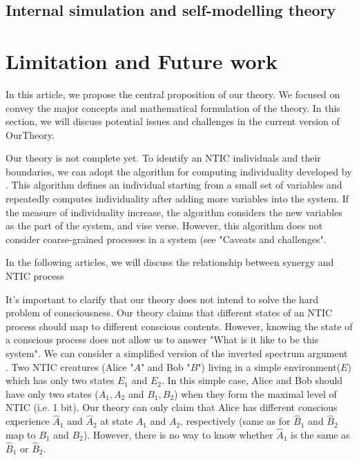 \documentclass[utf8]{article}
\begin{document}
		\subsection{Internal simulation and self-modelling theory}



    \section{Limitation and Future work}\label{sec:Limitation and Future work}  
        In this article, we propose the central proposition of our theory. We focused on convey the major concepts and mathematical formulation of the theory. In this section, we will discuss potential issues and challenges in the current version of \ac{OurTheory}.
        
        
    
    
    
        Our theory is not complete yet. 
        To identify an NTIC individuals and their boundaries, we can adopt the algorithm for computing individuality developed by \cite{krakauer2014information}. This algorithm defines an individual starting from a small set of variables and repeatedly computes individuality after adding more variables into the system. If the measure of individuality increase, the algorithm considers the new variables as the part of the system, and vise verse. However, this algorithm does not consider coarse-grained processes in a system (see "Caveats and challenges"\cite[p. 13]{krakauer2014information}. 
        
        
        In the following articles, we will discuss the relationship between synergy and NTIC process
    
    
    
    
        It's important to clarify that our theory does not intend to solve the hard problem of consciousness\citep{chalmers1995facing}. Our theory claims that different states of an NTIC process should map to different conscious contents. However, knowing the state of a conscious process does not allow us to answer "What is it like to be this system"\citep{nagel1974like}. We can consider a simplified version of the inverted spectrum argument \citep{Shoemaker1982-SHOTIS, Block1990-BLOIE, Locke1979-LOCTCE-2}. Two NTIC creatures (Alice "$A$" and Bob "$B$") living in a simple environment($E$) which has only two states $E_1$ and $E_2$. In this simple case, Alice and Bob should have only two states ($A_1, A_2$ and $B_1, B_2$) when they form the maximal level of NTIC (i.e. 1 bit). Our theory can only claim that Alice has different conscious experience $\hat{A}_1$ and $\hat{A}_2$ at state $A_1$ and $A_2$, respectively (same as for $\hat{B}_1$ and $\hat{B}_2$ map to $B_1$ and $B_2$). However, there is no way to know whether $\hat{A}_1$ is the same as $\hat{B}_1$ or $\hat{B}_2$. 
        
\end{document}
